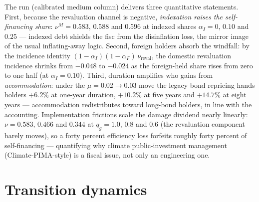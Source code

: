 \documentclass[12pt]{article}
\makeatletter
\newcommand{\FloatBarrier}{\par
    \begingroup\let\@elt\relax
    \edef\reserved@a{\@deferlist}\endgroup
    \ifx\reserved@a\@empty\else\clearpage\fi}
\makeatother
\begin{document}
The run (calibrated medium column) delivers three quantitative statements.
First, because the revaluation channel is negative, \emph{indexation raises
the self-financing share}: $\nu^{M} = 0.583$, $0.588$ and $0.596$ at indexed
shares $\alpha_I = 0$, $0.10$ and $0.25$ --- indexed debt shields the fisc
from the disinflation loss, the mirror image of the usual
inflating-away logic. Second, foreign holders absorb the windfall: by the
incidence identity $(1-\alpha_I)(1-\alpha_F)\,\nu_{\mathrm{reval}}$, the
domestic revaluation incidence shrinks from $-0.048$ to $-0.024$ as the
foreign-held share rises from zero to one half (at $\alpha_I = 0.10$).
Third, duration amplifies who gains from \emph{accommodation}: under the
$\mu = 0.02 \to 0.03$ move the legacy bond repricing hands holders
$+6.2\%$ at one-year duration, $+10.2\%$ at five years and $+14.7\%$ at
eight years --- accommodation redistributes toward long-bond
holders, in line with the \citet{hallsargent2011} accounting.
Implementation frictions scale the damage dividend nearly linearly:
$\nu = 0.583$, $0.466$ and $0.344$ at $q_g = 1.0$, $0.8$ and $0.6$
(the revaluation component barely moves), so a forty
percent efficiency loss forfeits roughly forty percent of self-financing
--- quantifying why climate public-investment management
(Climate-PIMA-style) is a fiscal issue, not only an engineering one.


\FloatBarrier
\section{Transition dynamics}\label{sec:transitions}
\end{document}
